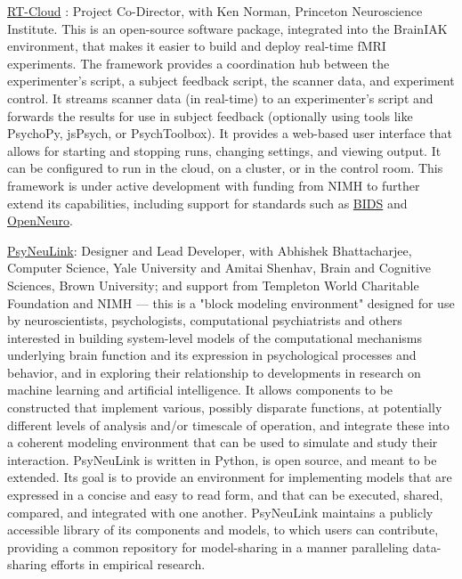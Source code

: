 \documentclass[10 pt]{article}
\begin{document}
\href{https://github.com/brainiak/rt-cloud}{RT-Cloud} \cite{wallace2022rt-cloud}: Project Co-Director, with Ken
Norman, Princeton Neuroscience Institute. This is an open-source software package, integrated into the BrainIAK environment, that makes it easier to build and deploy real-time fMRI experiments. The framework provides a coordination hub between the experimenter’s script, a subject feedback script, the scanner data, and experiment control. It streams scanner data (in real-time) to an experimenter’s script and forwards the results for use in subject feedback (optionally using tools like PsychoPy, jsPsych, or PsychToolbox). It provides a web-based user interface that allows for starting and stopping runs, changing settings, and viewing output. It can be configured to run in the cloud, on a cluster, or in the control room. This framework is under active development with funding from NIMH to further extend its capabilities, including support for standards such as \href{https://bids.neuroimaging.io}{BIDS} and \href{https://openneuro.org}{OpenNeuro}.
    \smallskip

\href{http://psyneulink.org}{PsyNeuLink}: Designer and Lead Developer, with Abhishek Bhattacharjee, Computer Science, Yale University and Amitai Shenhav, Brain and Cognitive Sciences, Brown University; and support from Templeton World Charitable Foundation and NIMH — this is a "block modeling environment" designed for use by neuroscientists, psychologists, computational psychiatrists and others interested in building system-level models of the computational mechanisms underlying brain function and its expression in psychological processes and behavior, and in exploring their relationship to developments in research on machine learning and artificial intelligence. It allows components to be constructed that implement various, possibly disparate functions, at potentially different levels of analysis and/or timescale of operation, and integrate these into a coherent modeling environment that can be used to simulate and study their interaction. PsyNeuLink is written in Python, is open source, and meant to be extended. Its goal is to provide an environment for implementing models that are expressed in a concise and easy to read form, and that can be executed, shared, compared, and integrated with one another. PsyNeuLink maintains a publicly accessible library of its components and models, to which users can contribute, providing a common repository for model-sharing in a manner paralleling data-sharing efforts in empirical research.
    \smallskip
\end{document}
